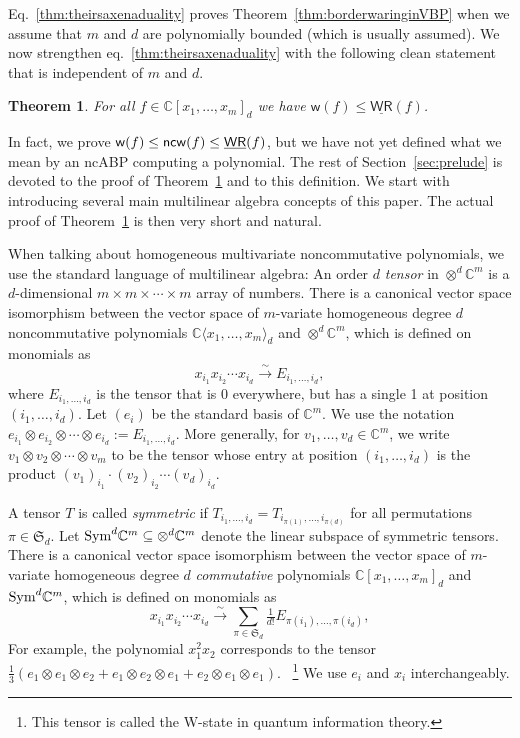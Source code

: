 \documentclass[10pt,a4paper]{article}
\numberwithin{equation}{section}
\newtheorem{theorem}[equation]{Theorem}
\theoremstyle{definition}
\newcommand{\Sym}{\textup{Sym}}
\newcommand{\IC}{\mathbb{C}}
\newcommand{\aS}{\mathfrak{S}}
\newcommand{\ncw}{\textup{\textsf{ncw}}}
\newcommand{\wW}{{\mathsf{w}}}
\newcommand{\WRbar}{\underline{\mathsf{WR}}}
\begin{document}
Eq.~\eqref{thm:theirsaxenaduality} proves Theorem~\ref{thm:borderwaringinVBP} when we assume that $m$ and $d$ are polynomially bounded (which is usually assumed).
We now strengthen eq.~\eqref{thm:theirsaxenaduality} with the following clean statement that is independent of $m$ and $d$.
\begin{theorem}\label{thm:oursaxenaduality}
For all $f \in \IC[x_1,\ldots,x_m]_d$ we have $\wW(f) \leq \WRbar(f)$.
\end{theorem}
In fact, we prove
$\wW(f) \leq \ncw(f) \leq \WRbar(f)$, but we have not yet defined what we mean by an ncABP computing a polynomial.
The rest of Section~\ref{sec:prelude} is devoted to the proof of Theorem~\ref{thm:oursaxenaduality} and to this definition. We start with introducing several main multilinear algebra concepts of this paper. The actual proof of Theorem~\ref{thm:oursaxenaduality} is then very short and natural.

When talking about homogeneous multivariate noncommutative polynomials, we use the standard language of multilinear algebra: An order $d$ \emph{tensor} in $\otimes^d \IC^m$ is a $d$-dimensional $m \times m \times \cdots \times m$ array of numbers.
There is a canonical vector space isomorphism between the vector space of $m$-variate homogeneous degree $d$ noncommutative polynomials $\IC\langle x_1,\ldots,x_m\rangle_d$ and $\otimes^d \IC^m$, which is defined on monomials as
\[
x_{i_1} x_{i_2} \cdots x_{i_d} \stackrel{\sim}{\longrightarrow} E_{i_1,\ldots,i_d},
\]
where $E_{i_1,\ldots,i_d}$ is the tensor that is 0 everywhere, but has a single 1 at position $(i_1,\ldots,i_d)$.
Let $(e_i)$ be the standard basis of $\IC^m$. We use the notation $e_{i_1}\otimes e_{i_2}\otimes \cdots \otimes e_{i_d} := E_{i_1,\ldots,i_d}$.
More generally, for $v_1,\ldots,v_d \in \IC^m$, we write $v_1 \otimes v_2 \otimes \cdots \otimes v_m$ to be the tensor whose entry at position $(i_1,\ldots,i_d)$ is the product $(v_1)_{i_1}\cdot (v_2)_{i_2} \cdots (v_d)_{i_d}$.

A tensor $T$ is called \emph{symmetric} if $T_{i_1,\ldots,i_d} = T_{i_{\pi(1)},\ldots,i_{\pi(d)}}$ for all permutations $\pi \in \aS_d$. Let $\Sym^d \IC^m \subseteq \otimes^d \IC^m$ denote the linear subspace of symmetric tensors.
There is a canonical vector space isomorphism between the vector space of $m$-variate homogeneous degree $d$ \emph{commutative} polynomials $\IC[x_1,\ldots,x_m]_d$ and $\Sym^d \IC^m$, which is defined on monomials as
\[
x_{i_1} x_{i_2} \cdots x_{i_d} \stackrel{\sim}{\longrightarrow} \sum_{\pi \in \aS_d} \tfrac{1}{d!} E_{\pi(i_1),\ldots,\pi(i_d)},
\]
For example, the polynomial $x_1^2 x_2$ corresponds to the tensor $\frac 1 3 (e_1 \otimes e_1 \otimes e_2 + e_1 \otimes e_2 \otimes e_1 + e_2 \otimes e_1 \otimes e_1)$. \ \footnote{This tensor is called the W-state in quantum information theory.}
We use $e_i$ and $x_i$ interchangeably.
\end{document}
